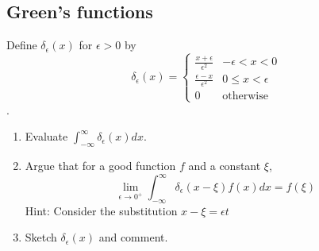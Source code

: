\documentclass[a4paper]{article}
\begin{document}
\subsection*{Green's functions}
\begin{qns}
Define $\delta_\epsilon(x)$ for $\epsilon>0$ by 
$$\delta_\epsilon(x)=
\left\{
        \begin{array}{ll}
      \frac{x+\epsilon}{\epsilon^2} & -\epsilon< x<0 \\
      \frac{\epsilon-x}{\epsilon^2} & 0\leq x<\epsilon\\
      0 & \text{otherwise}
        \end{array}
    \right.$$.
\begin{enumerate}[label=(\alph*)]
    \item Evaluate $\int_{-\infty}^\infty\delta_\epsilon(x)dx$.
    \item Argue that for a good function $f$ and a constant $\xi$,
    $$\lim_{\epsilon\rightarrow0^+}\int_{-\infty}^\infty\delta_\epsilon(x-\xi)f(x)dx=f(\xi)$$
    Hint: Consider the substitution $x-\xi=\epsilon t$
    \item Sketch $\delta_\epsilon(x)$ and comment.
\end{enumerate}
\end{qns}
\end{document}
